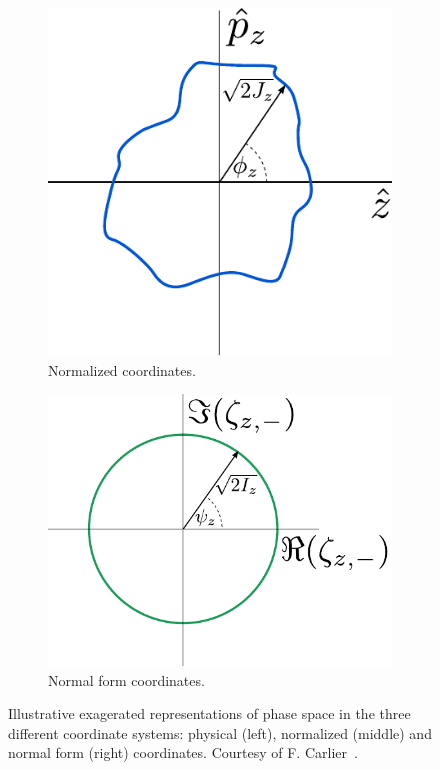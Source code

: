 \begin{figure}[!hbt]
\begin{subfigure}[b]{0.30\textwidth}
        \includegraphics[width=\textwidth]{Figures/Beam_Dynamics_Theory/phase_space_nonlinear_normalized.pdf}
        \caption{Normalized coordinates.}
        \label{fig:phase_space_normalized_non-linear}
    \end{subfigure}
    \hfill
    \begin{subfigure}[b]{0.3805\textwidth}
        \centering
        \includegraphics[width=\textwidth]{Figures/Beam_Dynamics_Theory/phase_space_nonlinear_normal_form.pdf}
        \caption{Normal form coordinates.}
        \label{fig:phase_space_normal_form_non-linear}
    \end{subfigure}
    \caption{Illustrative exagerated representations of phase space in the three different coordinate systems: physical (left), normalized (middle) and normal form (right) coordinates. Courtesy of F. Carlier~\cite{PHD:Carlier}.}
    \label{figure:phase_space_non-linear_physical_normalized_normal_form_coordinates}
\end{figure}

